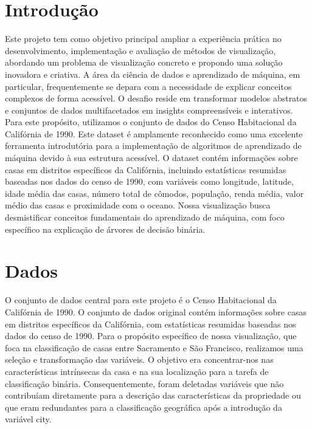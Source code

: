 \documentclass{article}
\begin{document}
\tableofcontents

\newpage


\section{Introdução}

Este projeto tem como objetivo principal ampliar a experiência prática no desenvolvimento, 
implementação e avaliação de métodos de visualização, abordando um problema de visualização 
concreto e propondo uma solução inovadora e criativa. A área da ciência de dados e aprendizado 
de máquina, em particular, frequentemente se depara com a necessidade de explicar conceitos 
complexos de forma acessível. O desafio reside em transformar modelos abstratos e conjuntos 
de dados multifacetados em insights compreensíveis e interativos.
Para este propósito, utilizamos o conjunto de dados do Censo Habitacional da Califórnia de 
1990. Este dataset é amplamente reconhecido como uma excelente ferramenta introdutória para a 
implementação de algoritmos de aprendizado de máquina devido à sua estrutura acessível.
O dataset contém informações sobre casas em distritos específicos da Califórnia, 
incluindo estatísticas resumidas baseadas nos dados do censo de 1990, com variáveis como 
longitude, latitude, idade média das casas, número total de cômodos, população, renda média, 
valor médio das casas e proximidade com o oceano.
Nossa visualização busca desmistificar conceitos fundamentais do aprendizado de máquina, 
com foco específico na explicação de árvores de decisão binária.

\section{Dados}

O conjunto de dados central para este projeto é o Censo Habitacional da Califórnia de 1990. 
O conjunto de dados original contém informações sobre casas em distritos específicos da Califórnia, 
com estatísticas resumidas baseadas nos dados do censo de 1990. Para o propósito específico de nossa 
visualização, que foca na classificação de casas entre Sacramento e São Francisco, realizamos uma seleção 
e transformação das variáveis. O objetivo era concentrar-nos nas 
características intrínsecas da casa e na sua localização para a tarefa de classificação binária. Consequentemente, 
foram deletadas variáveis que não contribuíam diretamente para a descrição das características da propriedade 
ou que eram redundantes para a classificação geográfica após a introdução da variável city.
\end{document}
